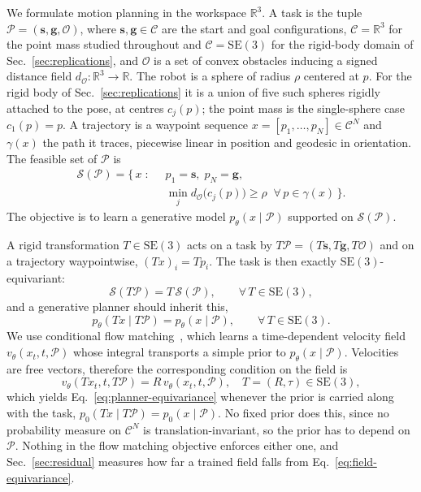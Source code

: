 \documentclass[conference]{IEEEtran}
\newcommand{\SE}{\mathrm{SE}(3)}
\newcommand{\svec}{\mathbf{s}}
\newcommand{\gvec}{\mathbf{g}}
\begin{document}
We formulate motion planning in the workspace $\mathbb{R}^3$. A task is the
tuple $\mathcal{P} = (\svec, \gvec, \mathcal{O})$, where
$\svec, \gvec \in \mathcal{C}$ are the start and goal configurations,
$\mathcal{C} = \mathbb{R}^3$ for the point mass studied throughout and
$\mathcal{C} = \SE$ for the rigid-body domain of
Sec.~\ref{sec:replications},
and $\mathcal{O}$ is a set of convex obstacles inducing a signed distance field
$d_{\mathcal{O}} : \mathbb{R}^3 \to \mathbb{R}$. The robot is a sphere of radius
$\rho$ centered at $p$. For the rigid body of Sec.~\ref{sec:replications} it is a
union of five such spheres rigidly attached to the pose, at centres $c_j(p)$; the
point mass is the single-sphere case $c_1(p) = p$. A trajectory is a waypoint
sequence $x = [p_1, \dots, p_N] \in \mathcal{C}^N$ and $\gamma(x)$ the path it
traces, piecewise linear in position and geodesic in orientation. The feasible
set of $\mathcal{P}$ is
\begin{equation}
\begin{aligned}
  \mathcal{S}(\mathcal{P}) = \big\{\, x \;:\;\; & p_1 = \svec,\; p_N = \gvec, \\
  & \min_j d_{\mathcal{O}}\big(c_j(p)\big) \ge \rho
    \;\; \forall\, p \in \gamma(x) \,\big\}.
\end{aligned}
  \label{eq:feasible}
\end{equation}
The objective is to learn a generative model
$p_\theta(x \mid \mathcal{P})$ supported on $\mathcal{S}(\mathcal{P})$.

A rigid transformation $T \in \SE$ acts on a task by
$T\mathcal{P} = (T\svec, T\gvec, T\mathcal{O})$ and on a trajectory waypointwise,
$(Tx)_i = Tp_i$. The task is then exactly $\SE$-equivariant:
\begin{equation}
  \mathcal{S}(T\mathcal{P}) = T\,\mathcal{S}(\mathcal{P}),
  \qquad \forall\, T \in \SE ,
  \label{eq:equivariance}
\end{equation}
and a generative planner should inherit this,
\begin{equation}
  p_\theta(Tx \mid T\mathcal{P}) = p_\theta(x \mid \mathcal{P}),
  \qquad \forall\, T \in \SE .
  \label{eq:planner-equivariance}
\end{equation}
We use conditional flow matching~\cite{lipman2023fm}, which learns a
time-dependent velocity field $v_\theta(x_t, t, \mathcal{P})$ whose integral
transports a simple prior to $p_\theta(x \mid \mathcal{P})$. Velocities are free
vectors, therefore the corresponding condition on the field is
\begin{equation}
  v_\theta(Tx_t, t, T\mathcal{P}) = R\, v_\theta(x_t, t, \mathcal{P}),
  \quad T = (R, \tau) \in \SE ,
  \label{eq:field-equivariance}
\end{equation}
which yields Eq.~\eqref{eq:planner-equivariance} whenever the prior is carried
along with the task, $p_0(Tx \mid T\mathcal{P}) = p_0(x \mid \mathcal{P})$. No
fixed prior does this, since no probability measure on $\mathcal{C}^N$ is
translation-invariant, so the prior has to depend on $\mathcal{P}$. Nothing in the flow matching
objective enforces either one, and Sec.~\ref{sec:residual} measures how far a
trained field falls from Eq.~\eqref{eq:field-equivariance}.
\end{document}
